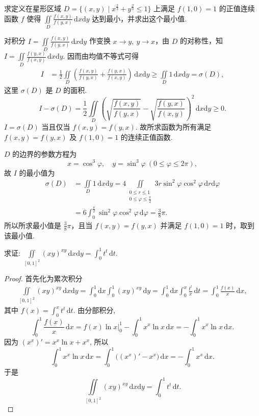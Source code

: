 \documentclass[../../main.tex]{subfiles}%
\begin{document}
\begin{example}
求定义在星形区域 $D = \{(x,y) \mid x^{\frac{2}{3}} + y^{\frac{2}{3}} \leqslant 1\}$ 上满足 $f(1,0) = 1$ 的正值连续函数 $f$ 使得 $\iint\limits_D \frac{f(x,y)}{f(y,x)} \,\mathrm{d}x\mathrm{d}y$ 达到最小，并求出这个最小值.
\end{example}
\begin{solution}
对积分 $I = \iint\limits_D \frac{f(x,y)}{f(y,x)} \,\mathrm{d}x\mathrm{d}y$ 作变换 $x \to y,\ y \to x$，由 $D$ 的对称性，知 $I = \iint\limits_D \frac{f(y,x)}{f(x,y)} \,\mathrm{d}x\mathrm{d}y$. 因而由均值不等式可得
\begin{align*}
I &= \frac{1}{2} \iint\limits_D \left( \frac{f(x,y)}{f(y,x)} + \frac{f(y,x)}{f(x,y)} \right) \,\mathrm{d}x\mathrm{d}y \geqslant \iint\limits_D 1 \,\mathrm{d}x\mathrm{d}y = \sigma(D),
\end{align*}
这里 $\sigma(D)$ 是 $D$ 的面积.
\[
I - \sigma(D) = \frac{1}{2} \iint\limits_D \left( \sqrt{\frac{f(x,y)}{f(y,x)}} - \sqrt{\frac{f(y,x)}{f(x,y)}} \right)^2 \,\mathrm{d}x\mathrm{d}y \geqslant 0.
\]
$I = \sigma(D)$ 当且仅当 $f(x,y) = f(y,x)$. 故所求函数为所有满足 $f(x,y) = f(y,x)$ 及 $f(1,0) = 1$ 的连续正值函数.

$D$ 的边界的参数方程为
\[
x = \cos^3 \varphi,\quad y = \sin^3 \varphi\ (0 \leqslant \varphi \leqslant 2\pi),
\]
故 $I$ 的最小值为
\begin{align*}
\sigma(D) &= \iint\limits_D 1 \,\mathrm{d}x\mathrm{d}y = 4 \iint\limits_{\substack{0 \leqslant r \leqslant 1 \\ 0 \leqslant \varphi \leqslant \frac{\pi}{2}}} 3r \sin^2 \varphi \cos^2 \varphi \,\mathrm{d}r\mathrm{d}\varphi \\
&= 6 \int_0^{\frac{\pi}{2}} \sin^2 \varphi \cos^2 \varphi \,\mathrm{d}\varphi = \frac{3}{8}\pi.
\end{align*}
所以所求最小值是 $\frac{3}{8}\pi$，且当 $f(x,y) = f(y,x)$ 并满足 $f(1,0) = 1$ 时，取到该最小值.

\end{solution}

\begin{example}
求证: $\iint\limits_{[0,1]^2} (xy)^{xy} \, \mathrm{d}x\mathrm{d}y = \int_0^1 t^t \, \mathrm{d}t$.
\end{example}
\begin{proof}
首先化为累次积分
\begin{align*}
\iint\limits_{[0,1]^2} (xy)^{xy} \, \mathrm{d}x\mathrm{d}y = \int_0^1 \mathrm{d}x \int_0^1 (xy)^{xy} \, \mathrm{d}y = \int_0^1 \mathrm{d}x \int_0^x \frac{t^t}{x} \, \mathrm{d}t = \int_0^1 \frac{f(x)}{x} \, \mathrm{d}x,
\end{align*}
其中 $f(x) = \int_0^x t^t \, \mathrm{d}t$. 由分部积分,
\[
\int_0^1 \frac{f(x)}{x} \, \mathrm{d}x = f(x) \ln x \bigg|_0^1 - \int_0^1 x^x \ln x \, \mathrm{d}x = - \int_0^1 x^x \ln x \, \mathrm{d}x.
\]
因为 $(x^x)' = x^x \ln x + x^x$, 所以
\[
\int_0^1 x^x \ln x \, \mathrm{d}x = \int_0^1 \big( (x^x)' - x^x \big) \, \mathrm{d}x = - \int_0^1 x^x \, \mathrm{d}x.
\]
于是
\[
\iint\limits_{[0,1]^2} (xy)^{xy} \, \mathrm{d}x\mathrm{d}y = \int_0^1 t^t \, \mathrm{d}t.
\]
\end{proof}
\end{document}
